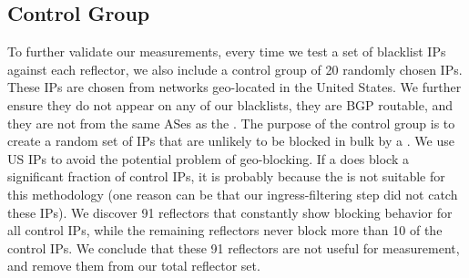 
\subsection{Control Group}
\label{sec:methvalid}
To further validate our measurements, every time we test a set of
blacklist IPs against each reflector, we also include a control group
of 20 randomly chosen IPs. These IPs are chosen from networks
geo-located in the United States. We further ensure they do not
appear on any of our blacklists, they are BGP routable, and they are
not from the same ASes as the {}. The purpose of the
control group is to create a random set of IPs that are unlikely to be
blocked in bulk by a {}. We use US IPs to avoid the
potential problem of geo-blocking. If a {} does block a
significant fraction of control IPs, it is probably because the
{} is not suitable for this methodology (one reason can be
that our ingress-filtering step did not catch these IPs). We discover
91 reflectors that constantly show blocking behavior for all control
IPs, while the remaining reflectors never block more than 10 of the
control IPs. We conclude that these 91 reflectors are not useful for
measurement, and remove them from our total reflector set.

